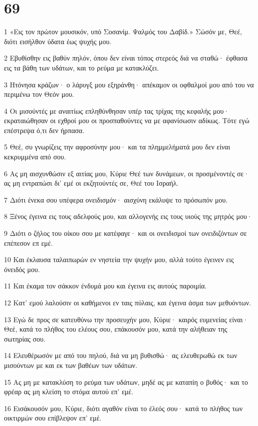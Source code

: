 \chapter{69}

\par 1 «Εις τον πρώτον μουσικόν, υπό Σοσανίμ. Ψαλμός του Δαβίδ.» Σώσόν με, Θεέ, διότι εισήλθον ύδατα έως ψυχής μου.
\par 2 Εβυθίσθην εις βαθύν πηλόν, όπου δεν είναι τόπος στερεός διά να σταθώ· έφθασα εις τα βάθη των υδάτων, και το ρεύμα με κατακλύζει.
\par 3 Ητόνησα κράζων· ο λάρυγξ μου εξηράνθη· απέκαμον οι οφθαλμοί μου από του να περιμένω τον Θεόν μου.
\par 4 Οι μισούντές με αναιτίως επληθύνθησαν υπέρ τας τρίχας της κεφαλής μου· εκραταιώθησαν οι εχθροί μου οι προσπαθούντες να με αφανίσωσιν αδίκως. Τότε εγώ επέστρεψα ό,τι δεν ήρπασα.
\par 5 Θεέ, συ γνωρίζεις την αφροσύνην μου· και τα πλημμελήματά μου δεν είναι κεκρυμμένα από σου.
\par 6 Ας μη αισχυνθώσιν εξ αιτίας μου, Κύριε Θεέ των δυνάμεων, οι προσμένοντές σε· ας μη εντραπώσι δι' εμέ οι εκζητούντές σε, Θεέ του Ισραήλ.
\par 7 Διότι ένεκα σου υπέφερα ονειδισμόν· αισχύνη εκάλυψε το πρόσωπόν μου.
\par 8 Ξένος έγεινα εις τους αδελφούς μου, και αλλογενής εις τους υιούς της μητρός μου·
\par 9 Διότι ο ζήλος του οίκου σου με κατέφαγε· και οι ονειδισμοί των ονειδιζόντων σε επέπεσον επ εμέ.
\par 10 Και έκλαυσα ταλαιπωρών εν νηστεία την ψυχήν μου, αλλά τούτο έγεινεν εις όνειδός μου.
\par 11 Και έκαμα τον σάκκον ένδυμά μου και έγεινα εις αυτούς παροιμία.
\par 12 Κατ' εμού λαλούσιν οι καθήμενοι εν ταις πύλαις, και έγεινα άσμα των μεθυόντων.
\par 13 Εγώ δε προς σε κατευθύνω την προσευχήν μου, Κύριε· καιρός ευμενείας είναι· Θεέ, κατά το πλήθος του ελέους σου, επάκουσόν μου, κατά την αλήθειαν της σωτηρίας σου.
\par 14 Ελευθέρωσόν με από του πηλού, διά να μη βυθισθώ· ας ελευθερωθώ εκ των μισούντων με και εκ των βαθέων των υδάτων.
\par 15 Ας μη με κατακλύση το ρεύμα των υδάτων, μηδέ ας με καταπίη ο βυθός· και το φρέαρ ας μη κλείση το στόμα αυτού επ' εμέ.
\par 16 Εισάκουσόν μου, Κύριε, διότι αγαθόν είναι το έλεός σου· κατά το πλήθος των οικτιρμών σου επίβλεψον επ' εμέ.
